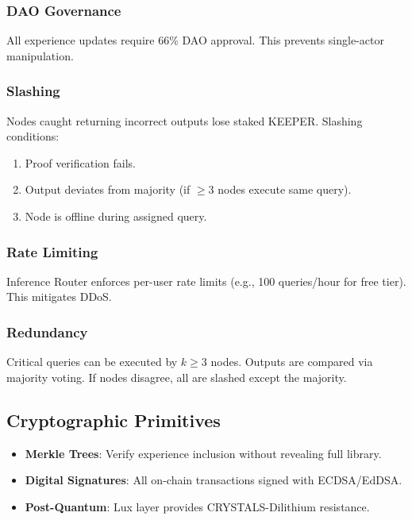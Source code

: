 \documentclass[11pt,a4paper]{article}
\begin{document}
\subsubsection{DAO Governance}

All experience updates require 66\% DAO approval. This prevents single-actor manipulation.

\subsubsection{Slashing}

Nodes caught returning incorrect outputs lose staked KEEPER. Slashing conditions:
\begin{enumerate}
\item Proof verification fails.
\item Output deviates from majority (if $\geq 3$ nodes execute same query).
\item Node is offline during assigned query.
\end{enumerate}

\subsubsection{Rate Limiting}

Inference Router enforces per-user rate limits (e.g., 100 queries/hour for free tier). This mitigates DDoS.

\subsubsection{Redundancy}

Critical queries can be executed by $k \geq 3$ nodes. Outputs are compared via majority voting. If nodes disagree, all are slashed except the majority.

\subsection{Cryptographic Primitives}

\begin{itemize}
\item \textbf{Merkle Trees}: Verify experience inclusion without revealing full library.
\item \textbf{Digital Signatures}: All on-chain transactions signed with ECDSA/EdDSA.
\item \textbf{Post-Quantum}: Lux layer provides CRYSTALS-Dilithium resistance.
\end{itemize}
\end{document}
